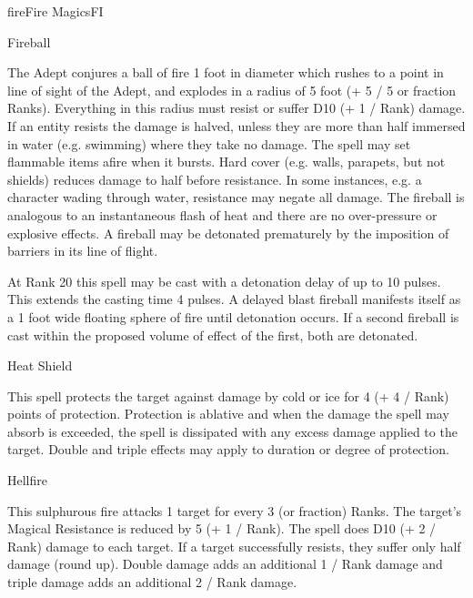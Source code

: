 \begin{College}[2.0]{fire}{Fire Magics}{FI}
\begin{spell}[S-4]{Fireball}

\begin{effects}
The Adept conjures a ball of fire 1 foot in diameter which rushes to a
point in line of sight of the Adept, and explodes in a radius of 5
foot (+ 5 / 5 or fraction Ranks). Everything in this radius must
resist or suffer D10 (+ 1 / Rank) damage.  If an entity resists the
damage is halved, unless they are more than half immersed in water
(e.g. swimming) where they take no damage.  The spell may set
flammable items afire when it bursts.  Hard cover (e.g. walls,
parapets, but not shields) reduces damage to half before resistance.
In some instances, e.g. a character wading through water, resistance
may negate all damage.  The fireball is analogous to an instantaneous
flash of heat and there are no over-pressure or explosive effects.  A
fireball may be detonated prematurely by the imposition of barriers in
its line of flight.

At Rank 20 this spell may be cast with a detonation delay of up to 10
pulses.  This extends the casting time 4 pulses.  A delayed blast
fireball manifests itself as a 1 foot wide floating sphere of fire
until detonation occurs. If a second fireball is cast within the
proposed volume of effect of the first, both are detonated.
\end{effects}
\end{spell}

\begin{spell}[S-5]{Heat Shield}

\begin{effects}
This spell protects the target against damage by cold or ice for 4 (+
4 / Rank) points of protection.  Protection is ablative and when the
damage the spell may absorb is exceeded, the spell is dissipated with
any excess damage applied to the target. Double and triple effects may
apply to duration or degree of protection.
\end{effects}
\end{spell}

\begin{spell}[S-6]{Hellfire}

\begin{effects}
This sulphurous fire attacks 1 target for every 3 (or fraction) Ranks.
The target’s Magical Resistance is reduced by 5 (+ 1 / Rank). The
spell does D10 (+ 2 / Rank) damage to each target.  If a target
successfully resists, they suffer only half damage (round up).  Double
damage adds an additional 1 / Rank damage and triple damage adds an
additional 2 / Rank damage.
\end{effects}
\end{spell}


\end{College}
